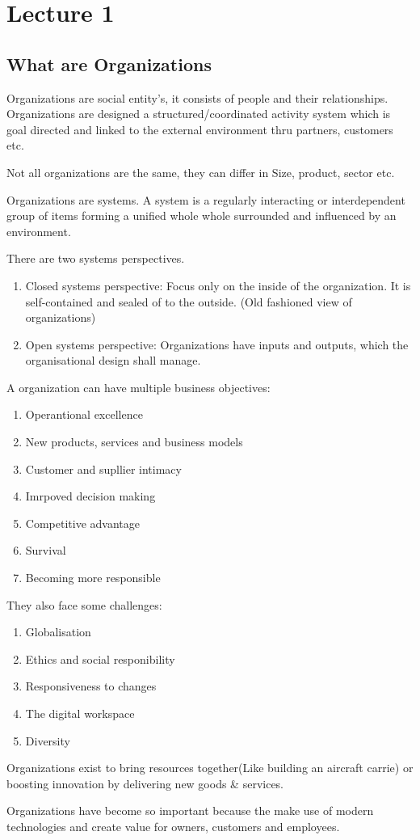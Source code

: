 \documentclass[nonacm, sigconf, balance=truu]{acmart}
\begin{document}
    \onecolumn
    \section{Lecture 1}
    \subsection{What are Organizations}
        Organizations are social entity's, it consists of people and their relationships.
        Organizations are designed a structured/coordinated activity system which is goal directed 
        and linked to the external environment thru partners, customers etc. 

        Not all organizations are the same, they can differ in Size, product, sector etc. 
        
        Organizations are systems. A system is a regularly interacting or interdependent group of 
        items forming a unified whole whole surrounded and influenced by an environment.
        
        There are two systems perspectives. 
        \begin{enumerate}
            \item{Closed systems perspective: Focus only on the inside of the organization. It is self-contained 
            and sealed of to the outside. (Old fashioned view of organizations)}
            \item{Open systems perspective: Organizations have inputs and outputs, which the organisational design 
            shall manage.}
        \end{enumerate}

        A organization can have multiple business objectives:
        \begin{enumerate}
            \item{Operantional excellence}
            \item{New products, services and business models}
            \item{Customer and supllier intimacy}
            \item{Imrpoved decision making}
            \item{Competitive advantage}
            \item{Survival}
            \item{Becoming more responsible}
        \end{enumerate}
        They also face some challenges:
        \begin{enumerate}
            \item{Globalisation}
            \item{Ethics and social responibility}
            \item{Responsiveness to changes}
            \item{The digital workspace}
            \item{Diversity}
        \end{enumerate}
        Organizations exist to bring resources together(Like building an aircraft carrie) or 
        boosting innovation by delivering new goods \& services. 

        Organizations have become so important because the make use of modern technologies and 
        create value for owners, customers and employees.
    
\end{document}
